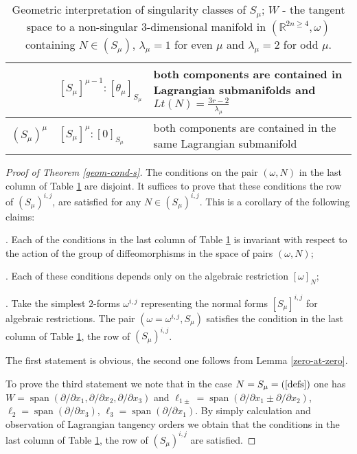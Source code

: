 \documentclass{amsart}
\theoremstyle{definition}
\numberwithin{equation}{section}
\begin{document}
\begin{center}
\begin{table}[h]
\begin{small}
\begin{tabular}{|p{1.2cm}|p{4.6cm}|p{6cm}|}
& $[S_{\mu}]^{\mu-1}: [ \theta _{\mu} ]_{S_{\mu}}$ & both components are contained in  Lagrangian submanifolds  and $Lt(N)=\frac{3r-2}{\lambda_{\mu}}$\\ \hline

$(S_{\mu}\!)^{\mu}$& $[S_{\mu}]^{\mu}: [ 0 ]_{S_{\mu}}$ & both components are contained in the same Lagrangian submanifold\\ \hline

    \end{tabular}

\smallskip

\caption{\small Geometric interpretation of singularity classes of $S_{\mu}$;
$W$ - the tangent space to a non-singular $3$-dimensional manifold  in $(\mathbb{R}^{2n\ge 4},\omega)$ containing $N\in (S_{\mu})$, $\lambda_{\mu}=1$ for even $\mu$ and $\lambda_{\mu}=2$ for odd $\mu$.}\label{tabs-geom}

\end{small}
\end{table}
\end{center}

\begin{proof}[Proof of Theorem \ref{geom-cond-s}]
The conditions on the pair $(\omega, N)$ in the last column of Table \ref{tabs-geom} are disjoint. It suffices to prove that these conditions  the row of $(S_{\mu})^{i,j}$, are satisfied for any $N\in (S_{\mu})^{i,j}$. This  is a corollary of the following claims:

\smallskip

. Each of the conditions in the last column of Table \ref{tabs-geom} is invariant with respect to the action of the group of diffeomorphisms in the space of pairs $(\omega , N)$;

\smallskip

. Each of these conditions depends only on the algebraic restriction $[\omega ]_N$;

\smallskip

. Take the simplest $2$-forms $\omega ^{i,j}$ representing the normal forms $[S_{\mu}]^{i,j}$ for algebraic restrictions.  The pair $(\omega = \omega ^{i,j}, S_{\mu})$ satisfies the condition in the last column of Table \ref{tabs-geom}, the row of $(S_{\mu})^{i,j}$.

\medskip

 The first statement is obvious,  the second one follows from  Lemma \ref{zero-at-zero}.

To prove the third statement we note that in the case $N = S_{\mu} = (\ref{defs})$ one has $W = \operatorname{span} (\partial/\partial x_1, \partial / \partial x_2, \partial / \partial x_3)$ and  $\ell _{1\pm} = \operatorname{span} (\partial /\partial x_1 \pm \partial /\partial x_2)$, $\ell _2 = \operatorname{span} (\partial /\partial x_3)$, $\ell _3 = \operatorname{span} (\partial /\partial x_1)$. By simply calculation and observation of Lagrangian tangency orders we obtain that the conditions in  the last column of Table \ref{tabs-geom}, the row of $(S_{\mu})^{i,j}$ are satisfied.

\end{proof}
\end{document}

